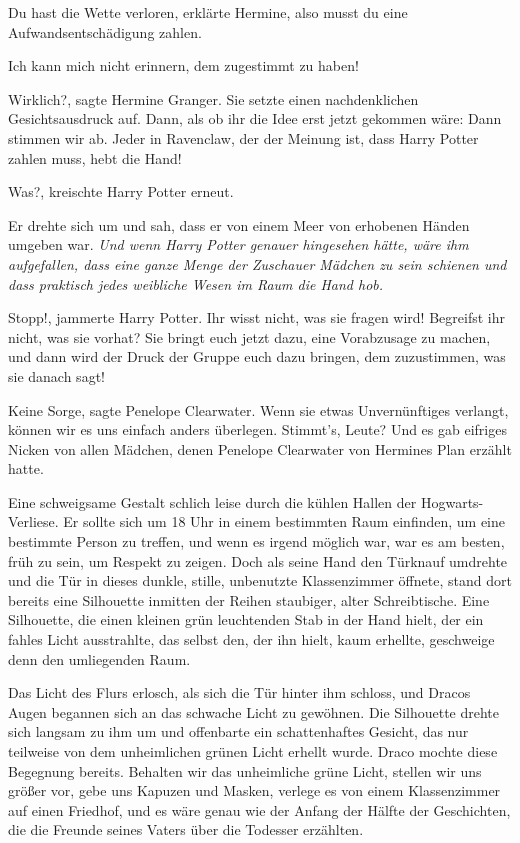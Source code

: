 \glqq Du hast die Wette verloren\grqq{}, erklärte Hermine, \glqq also musst du
eine Aufwandsentschädigung zahlen.\grqq{}

\glqq Ich kann mich nicht erinnern, dem zugestimmt zu haben!\grqq{}

\glqq Wirklich?\grqq{}, sagte Hermine Granger. Sie setzte einen nachdenklichen
Gesichtsausdruck auf. Dann, als ob ihr die Idee erst jetzt gekommen wäre: \glqq
Dann stimmen wir ab. Jeder in Ravenclaw, der der Meinung ist, dass Harry Potter
zahlen muss, hebt die Hand!\grqq{}

\glqq Was?\grqq{}, kreischte Harry Potter erneut.

Er drehte sich um und sah, dass er von einem Meer von erhobenen Händen umgeben
war. \emph{Und wenn Harry Potter genauer hingesehen hätte, wäre ihm aufgefallen,
dass eine ganze Menge der Zuschauer Mädchen zu sein schienen und dass praktisch
jedes weibliche Wesen im Raum die Hand hob.}

\glqq Stopp!\grqq{}, jammerte Harry Potter. \glqq Ihr wisst nicht, was sie
fragen wird! Begreifst ihr nicht, was sie vorhat? Sie bringt euch jetzt dazu,
eine Vorabzusage zu machen, und dann wird der Druck der Gruppe euch dazu
bringen, dem zuzustimmen, was sie danach sagt!\grqq{}

\glqq Keine Sorge\grqq{}, sagte Penelope Clearwater. \glqq Wenn sie etwas
Unvernünftiges verlangt, können wir es uns einfach anders überlegen. Stimmt's,
Leute?\grqq{} Und es gab eifriges Nicken von allen Mädchen, denen Penelope
Clearwater von Hermines Plan erzählt hatte.

Eine schweigsame Gestalt schlich leise durch die kühlen Hallen der
Hogwarts-Verliese. Er sollte sich um 18 Uhr in einem bestimmten Raum einfinden,
um eine bestimmte Person zu treffen, und wenn es irgend möglich war, war es am
besten, früh zu sein, um Respekt zu zeigen. Doch als seine Hand den Türknauf
umdrehte und die Tür in dieses dunkle, stille, unbenutzte Klassenzimmer öffnete,
stand dort bereits eine Silhouette inmitten der Reihen staubiger, alter
Schreibtische. Eine Silhouette, die einen kleinen grün leuchtenden Stab in der
Hand hielt, der ein fahles Licht ausstrahlte, das selbst den, der ihn hielt,
kaum erhellte, geschweige denn den umliegenden Raum.

Das Licht des Flurs erlosch, als sich die Tür hinter ihm schloss, und Dracos
Augen begannen sich an das schwache Licht zu gewöhnen. Die Silhouette drehte
sich langsam zu ihm um und offenbarte ein schattenhaftes Gesicht, das nur
teilweise von dem unheimlichen grünen Licht erhellt wurde. Draco mochte diese
Begegnung bereits. Behalten wir das unheimliche grüne Licht, stellen wir uns
größer vor, gebe uns Kapuzen und Masken, verlege es von einem Klassenzimmer auf
einen Friedhof, und es wäre genau wie der Anfang der Hälfte der Geschichten, die
die Freunde seines Vaters über die Todesser erzählten.

